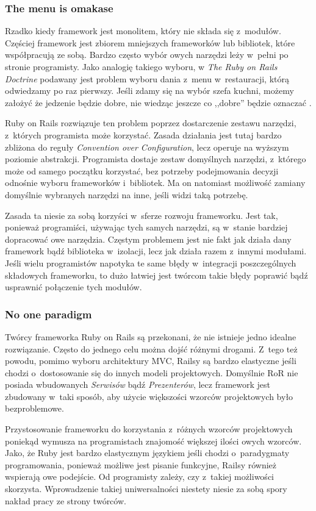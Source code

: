 \documentclass[mgr,oneside]{mgr}
\begin{document}
\subsubsection{The menu is omakase}
Rzadko kiedy framework jest monolitem, który nie składa się z~modułów. Częściej framework jest zbiorem mniejszych frameworków lub bibliotek, które współpracują ze sobą. Bardzo często wybór owych narzędzi leży w~pełni po stronie programisty. Jako analogię takiego wyboru, w \emph{The Ruby on Rails Doctrine} podawany jest problem wyboru dania z~menu w~restauracji, którą odwiedzamy po raz pierwszy. Jeśli zdamy się na wybór szefa kuchni, możemy założyć że jedzenie będzie dobre, nie wiedząc jeszcze co ,,dobre'' będzie oznaczać \cite{rails_doctrine}.

Ruby on Rails rozwiązuje ten problem poprzez dostarczenie zestawu narzędzi, z~których programista może korzystać. Zasada działania jest tutaj bardzo zbliżona do reguły \emph{Convention over Configuration}, lecz operuje na wyższym poziomie abstrakcji. Programista dostaje zestaw domyślnych narzędzi, z~którego może od samego początku korzystać, bez potrzeby podejmowania decyzji odnośnie wyboru frameworków i~bibliotek. Ma on natomiast możliwość zamiany domyślnie wybranych narzędzi na inne, jeśli widzi taką potrzebę.

Zasada ta niesie za sobą korzyści w~sferze rozwoju frameworku. Jest tak, ponieważ programiści, używając tych samych narzędzi, są w~stanie bardziej dopracować owe narzędzia. Częstym problemem jest nie fakt jak działa dany framework bądź biblioteka w~izolacji, lecz jak działa razem z~innymi modułami. Jeśli wielu programistów napotyka te same błędy w~integracji poszczególnych składowych frameworku, to dużo łatwiej jest twórcom takie błędy poprawić bądź usprawnić połączenie tych modułów.

\subsubsection{No one paradigm}
Twórcy frameworka Ruby on Rails są przekonani, że nie istnieje jedno idealne rozwiązanie. Często do jednego celu można dojść różnymi drogami. Z~tego też powodu, pomimo wyboru architektury MVC, Railsy są bardzo elastyczne jeśli chodzi o~dostosowanie się do innych modeli projektowych. Domyślnie RoR nie posiada wbudowanych \textit{Serwisów} bądź \textit{Prezenterów}, lecz framework jest zbudowany w~taki sposób, aby użycie większości wzorców projektowych było bezproblemowe.

Przystosowanie frameworku do korzystania z~różnych wzorców projektowych poniekąd wymusza na programistach znajomość większej ilości owych wzorców. Jako, że Ruby jest bardzo elastycznym językiem jeśli chodzi o~paradygmaty programowania, ponieważ możliwe jest pisanie funkcyjne, Railsy również wspierają owe podejście. Od programisty zależy, czy z~takiej możliwości skorzysta. Wprowadzenie takiej uniwersalności niestety niesie za sobą spory nakład pracy ze strony twórców.
\end{document}
